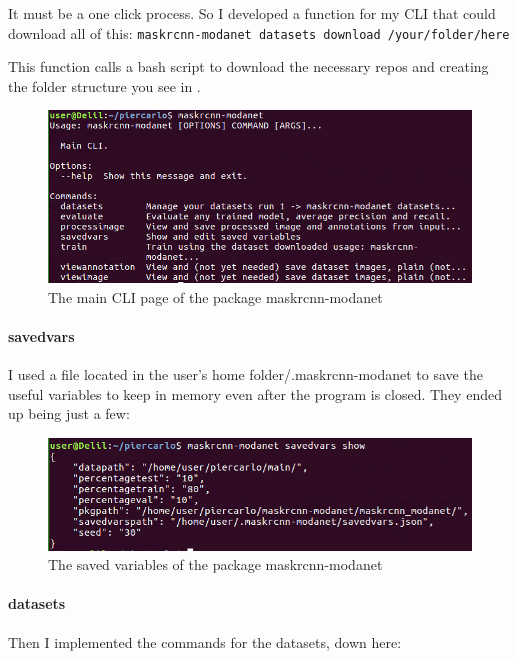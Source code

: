 It must be a one click process. So I developed a function for my CLI that could download all of this:  \lstinline[language=bash]|maskrcnn-modanet datasets download /your/folder/here|

This function calls a bash script to download the necessary repos and creating the folder structure you see in .

\begin{figure}[H]
	\centering
	\includegraphics[width=\linewidth]{figures/cli/main}
	\caption{The main CLI page of the package maskrcnn-modanet}
	\label{f:cli-main}
\end{figure}

\paragraph{savedvars}

I used a file located in the user's home folder/.maskrcnn-modanet to save the useful variables to keep in memory even after the program is closed. They ended up being just a few:

\begin{figure}[H]
	\centering
	\includegraphics[width=\linewidth]{figures/cli/savedvars}
	\caption{The saved variables of the package maskrcnn-modanet}
	\label{f:cli-savedvars}
\end{figure}

\paragraph{datasets}

Then I implemented the commands for the datasets, down here:

